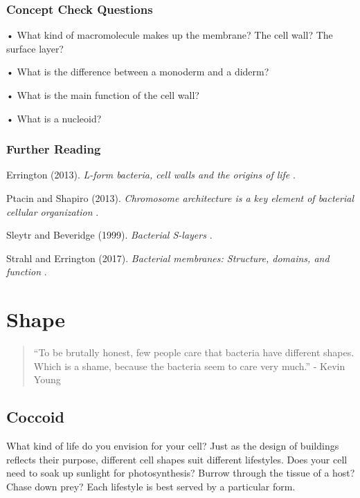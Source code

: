 \documentclass[]{tufte-book}
\begin{document}
\hypertarget{concept-check-questions}{%
\subsection*{Concept Check Questions}\label{concept-check-questions}}

• What kind of macromolecule makes up the membrane? The cell wall? The surface layer?

• What is the difference between a monoderm and a diderm?

• What is the main function of the cell wall?

• What is a nucleoid?

\hypertarget{further-reading-1}{%
\subsection*{Further Reading}\label{further-reading-1}}

Errington (2013). \emph{L-form bacteria, cell walls and the origins of life} \citep{errington2013}.

Ptacin and Shapiro (2013). \emph{Chromosome architecture is a key element of bacterial cellular organization} \citep{ptacin2013}.

Sleytr and Beveridge (1999). \emph{Bacterial S-layers} \citep{sleytr1999}.

Strahl and Errington (2017). \emph{Bacterial membranes: Structure, domains, and function} \citep{strahl2017}.

\hypertarget{shape}{%
\chapter{Shape}\label{shape}}

\begin{quote}
``To be brutally honest, few people care that bacteria have different shapes. Which is a shame, because the bacteria seem to care very much.''
- Kevin Young \citep{young2006}
\end{quote}

\hypertarget{coccoid}{%
\section{Coccoid}\label{coccoid}}

What kind of life do you envision for your cell? Just as the design of buildings reflects their purpose, different cell shapes suit different lifestyles. Does your cell need to soak up sunlight for photosynthesis? Burrow through the tissue of a host? Chase down prey? Each lifestyle is best served by a particular form.
\end{document}
